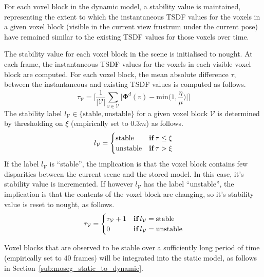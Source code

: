For each voxel block in the dynamic model, a stability value is maintained, 
representing the extent to which the instantaneous TSDF values for the voxels 
in a given voxel block (visible in the current view frustrum under the current 
pose) have remained similar to the existing TSDF values for those voxels
over time.

The stability value for each voxel block in the scene is initialised to nought.
At each frame, the instantaneous TSDF values for the voxels in each visible
voxel block are computed. For each voxel block, the mean absolute difference
\(\tau\), between the instantaneous and existing TSDF values is computed as
follows.
\begin{equation}
  \label{eqn:moseg_stability_value}
  \tau_{\mathcal{V}} = \Bigg[ \frac{1}{|\mathcal{V}|} \sum_{v \in \mathcal{V}}
  \bigg|\bm{\Phi}^{d}(v) - \text{min}\bigg(1, \frac{\eta}{\mu}\bigg)\bigg| \Bigg]
\end{equation}
The stability label \(l_{\mathcal{V}} \in \{\text{stable}, \text{unstable}\}\) for
a given voxel block \(\mathcal{V}\) is determined by thresholding on \(\xi\) 
(empirically set to \(0.3m\)) as follows.
\begin{equation}
  \label{eqn:moseg_stability_labelling}
  l_{\mathcal{V}} =
  \begin{cases}
    \text{stable} & \textbf{if} \mkern4mu \tau \leq \xi \\
    \text{unstable} & \textbf{if} \mkern4mu \tau > \xi
  \end{cases}
\end{equation}
If the label \(l_{\mathcal{V}}\) is ``stable'', the implication is that the voxel
block contains few disparities between the current scene and the stored model.
In this case, it's stability value is incremented. If however
\(l_{\mathcal{V}}\) has the label ``unstable'', the implication is that the
contents of the voxel block are changing, so it's stability value is reset to
nought, as follows.
\begin{equation}
  \label{eqn:moseg_stability_update}
  \tau_{\mathcal{V}} =
  \begin{cases}
    \tau_{\mathcal{V}} + 1 & \textbf{if} \mkern4mu l_{\mathcal{V}} =
    \text{stable}\\
    0 & \textbf{if} \mkern4mu l_{\mathcal{V}} = \text{unstable}
  \end{cases}
\end{equation}

Voxel blocks that are observed to be stable over a sufficiently long period of
time (empirically set to \(40\) frames) will be integrated into the static model,
as follows in Section~\ref{sub:moseg_static_to_dynamic}.

